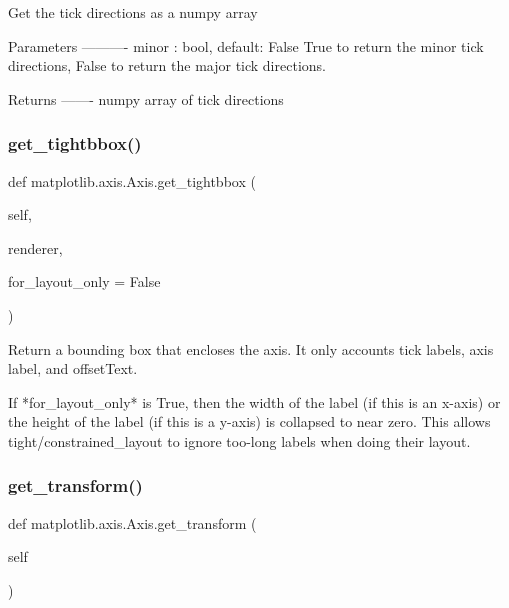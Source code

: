 \begin{DoxyVerb}Get the tick directions as a numpy array

Parameters
----------
minor : bool, default: False
    True to return the minor tick directions,
    False to return the major tick directions.

Returns
-------
numpy array of tick directions
\end{DoxyVerb}
 \mbox{\label{classmatplotlib_1_1axis_1_1Axis_a5ef7ef8a1c36d64e3ee8c3969fa0aec0}} 
\subsubsection{\texorpdfstring{get\+\_\+tightbbox()}{get\_tightbbox()}}
{\footnotesize\ttfamily def matplotlib.\+axis.\+Axis.\+get\+\_\+tightbbox (\begin{DoxyParamCaption}\item[{}]{self,  }\item[{}]{renderer,  }\item[{}]{for\+\_\+layout\+\_\+only = {\ttfamily False} }\end{DoxyParamCaption})}

\begin{DoxyVerb}Return a bounding box that encloses the axis. It only accounts
tick labels, axis label, and offsetText.

If *for_layout_only* is True, then the width of the label (if this
is an x-axis) or the height of the label (if this is a y-axis) is
collapsed to near zero.  This allows tight/constrained_layout to ignore
too-long labels when doing their layout.
\end{DoxyVerb}
 \mbox{\label{classmatplotlib_1_1axis_1_1Axis_af10651692ea1595c4548736dbd97ee9f}} 
\subsubsection{\texorpdfstring{get\+\_\+transform()}{get\_transform()}}
{\footnotesize\ttfamily def matplotlib.\+axis.\+Axis.\+get\+\_\+transform (\begin{DoxyParamCaption}\item[{}]{self }\end{DoxyParamCaption})}

